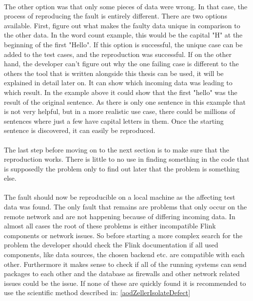 \paragraph{} The other option was that only some pieces of data were wrong. In that case, the process of reproducing the fault is entirely different. There are two options available. First, figure out what makes the faulty data unique in comparison to the other data. In the word count example, this would be the capital "H" at the beginning of the first "Hello". If this option is successful, the unique case can be added to the test cases, and the reproduction was successful. If on the other hand, the developer can't figure out why the one failing case is different to the others the tool that is written alongside this thesis can be used, it will be explained in detail later on. It can show which incoming data was leading to which result. In the example above it could show that the first "hello" was the result of the original sentence. As there is only one sentence in this example that is not very helpful, but in a more realistic use case, there could be millions of sentences where just a few have capital letters in them. Once the starting sentence is discovered, it can easily be reproduced.

\paragraph{} The last step before moving on to the next section is to make sure that the reproduction works. There is little to no use in finding something in the code that is supposedly the problem only to find out later that the problem is something else.

\paragraph{} The fault should now be reproducible on a local machine as the affecting test data was found. The only fault that remains are problems that only occur on the remote network and are not happening because of differing incoming data. In almost all cases the root of these problems is either incompatible Flink components or network issues. So before starting a more complex search for the problem the developer should check the Flink documentation if all used components, like data sources, the chosen backend etc. are compatible with each other. Furthermore it makes sense to check if all of the running systems can send packages to each other and the database as firewalls and other network related issues could be the issue. If none of these are quickly found it is recommended to use the scientific method described in: \ref{aodZellerIsolateDefect}

